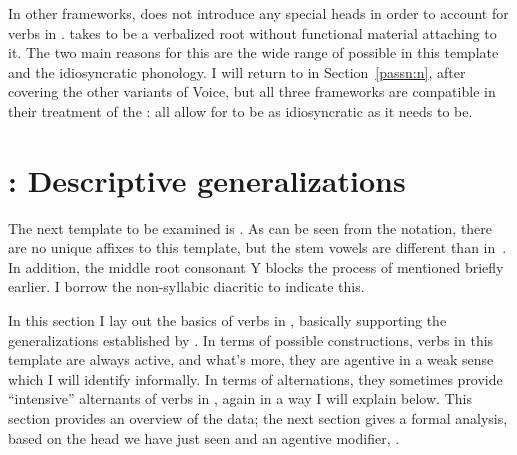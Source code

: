\begin{exe}
\begin{xlist}
\begin{exe}
\begin{xlist}
\begin{exe}
\begin{xlist}
\begin{exe}
\begin{exe}
\begin{xlist}
\begin{exe}
\begin{xlist}
\begin{exe}
\begin{xlist}
\begin{exe}
\begin{xlist}
\begin{exe}
\begin{xlist}
\begin{exe}
\begin{xlist}
\begin{exe}
\begin{xlist}
\begin{exe}
\begin{xlist}
\begin{xlist}
\begin{exe}
\begin{xlist}
\begin{exe}
\begin{xlist}
\begin{exe}
\begin{xlist}
\begin{exe}
\begin{xlist}
\begin{exe}
\begin{xlist}
\begin{exe}
\begin{xlist}
\begin{exe}
\begin{xlist}
\begin{exe}
\begin{xlist}
\begin{exe}
\begin{xlist}
\begin{exe}
\begin{xlist}
\begin{exe}
\begin{xlist}
\begin{exe}
\begin{xlist}
\begin{xlist}
\begin{xlist}
\begin{exe}
\begin{xlist}
\begin{xlist}
\begin{xlist}
\begin{exe}
\begin{exe}
\begin{xlist}
In other frameworks, \cite{doron03} does not introduce any special heads in order to account for verbs in {\tkal}. \cite{borer13oup,borer15roots} takes {\tkal} to be a verbalized root without functional material attaching to it. The two main reasons for this are the wide range of  possible in this template and the idiosyncratic phonology. I will return to  in Section~\ref{passn:n}, after covering the other variants of Voice, but all three frameworks are compatible in their treatment of the {\tkal}: all allow for {\tkal} to be as idiosyncratic as it needs to be.

\section{\tpie: Descriptive generalizations} \label{voice:tpie}
The next template to be examined is {\tpie}. As can be seen from the notation, there are no unique affixes to this template, but the stem vowels are different than in~{\tkal}. In addition, the middle root consonant Y blocks the process of  mentioned briefly earlier. I borrow the non-syllabic diacritic  to indicate this.

In this section I lay out the basics of verbs in {\tpie}, basically supporting the generalizations established by \cite{doron03}. In terms of possible constructions, verbs in this template are always active, and what's more, they are agentive in a weak sense which I will identify informally. In terms of alternations, they sometimes provide ``intensive'' alternants of verbs in {\tkal}, again in a way I will explain below. This section provides an overview of the data; the next section gives a formal analysis, based on the head  we have just seen and an agentive modifier, {\va}.


\end{xlist}
\end{exe}
\end{exe}
\end{xlist}
\end{xlist}
\end{xlist}
\end{exe}
\end{xlist}
\end{xlist}
\end{xlist}
\end{exe}
\end{xlist}
\end{exe}
\end{xlist}
\end{exe}
\end{xlist}
\end{exe}
\end{xlist}
\end{exe}
\end{xlist}
\end{exe}
\end{xlist}
\end{exe}
\end{xlist}
\end{exe}
\end{xlist}
\end{exe}
\end{xlist}
\end{exe}
\end{xlist}
\end{exe}
\end{xlist}
\end{exe}
\end{xlist}
\end{xlist}
\end{exe}
\end{xlist}
\end{exe}
\end{xlist}
\end{exe}
\end{xlist}
\end{exe}
\end{xlist}
\end{exe}
\end{xlist}
\end{exe}
\end{xlist}
\end{exe}
\end{xlist}
\end{exe}
\end{exe}
\end{xlist}
\end{exe}
\end{xlist}
\end{exe}
\end{xlist}
\end{exe}
